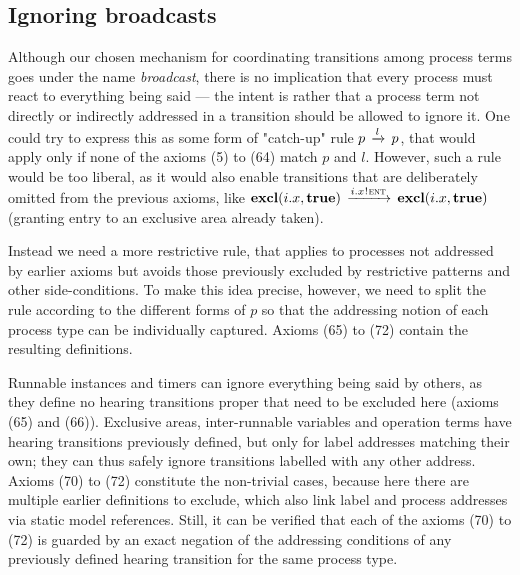 \documentclass[twocolumn]{article}
\begin{document}
\subsection{Ignoring broadcasts} \label{sect:Ignore}

Although our chosen mechanism for coordinating transitions among process terms goes under the name \emph{broadcast}, there is no implication that every process must react to everything being said --- the intent is rather that a process term not directly or indirectly addressed in a transition should be allowed to ignore it. One could try to express this as some form of "catch-up" rule $p \,\xrightarrow{l}\, p$, that would apply only if none of the axioms (5) to (64) match $p$ and $l$. However, such a rule would be too liberal, as it would also enable transitions that are deliberately omitted from the previous axioms, like ${\textbf{excl}(i.x,\textbf{true})} \,\xrightarrow{i.x \mspace{1mu}!\mspace{1mu} \textsc{ent}}\, {\textbf{excl}(i.x,\textbf{true})}$ (granting entry to an exclusive area already taken).

Instead we need a more restrictive rule, that applies to processes not addressed by earlier axioms but avoids those previously excluded by restrictive patterns and other side-conditions. To make this idea precise, however, we need to split the rule according to the different forms of $p$ so that the addressing notion of each process type can be individually captured. Axioms (65) to (72) contain the resulting definitions.

Runnable instances and timers can ignore everything being said by others, as they define no hearing transitions proper that need to be excluded here (axioms (65) and (66)). Exclusive areas, inter-runnable variables and operation terms have hearing transitions previously defined, but only for label addresses matching their own; they can thus safely ignore transitions labelled with any other address.
Axioms (70) to (72) constitute the non-trivial cases, because here there are multiple earlier definitions to exclude, which also link label and process addresses via static model references. Still, it can be verified that each of the axioms (70) to (72) is guarded by an exact negation of the addressing conditions of any previously defined hearing transition for the same process type.
\end{document}
